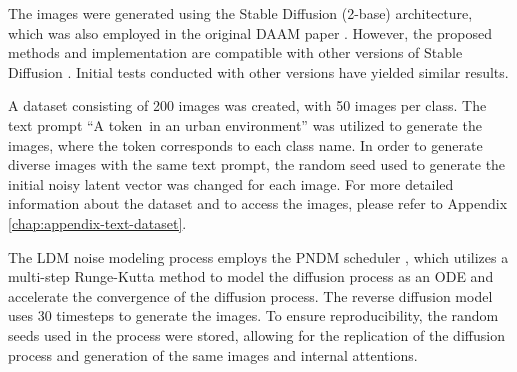 The images were generated using the Stable Diffusion (2-base) architecture, which was also employed in the original DAAM paper \cite{DAAM}. However, the proposed methods and implementation are compatible with other versions of Stable Diffusion \cite{rombach2022high}. Initial tests conducted with other versions have yielded similar results.

 A dataset consisting of 200 images was created, with 50 images per class. The text prompt ``A \textlangle token\textrangle\ in an urban environment'' was utilized to generate the images, where the token corresponds to each class name. In order to generate diverse images with the same text prompt, the random seed used to generate the initial noisy latent vector was changed for each image. For more detailed information about the dataset and to access the images, please refer to Appendix \ref{chap:appendix-text-dataset}.
 
The LDM noise modeling process employs the PNDM scheduler \cite{liu2022pseudo}, which utilizes a multi-step Runge-Kutta method to model the diffusion process as an ODE and accelerate the convergence of the diffusion process. The reverse diffusion model uses 30 timesteps to generate the images. To ensure reproducibility, the random seeds used in the process were stored, allowing for the replication of the diffusion process and generation of the same images and internal attentions.



